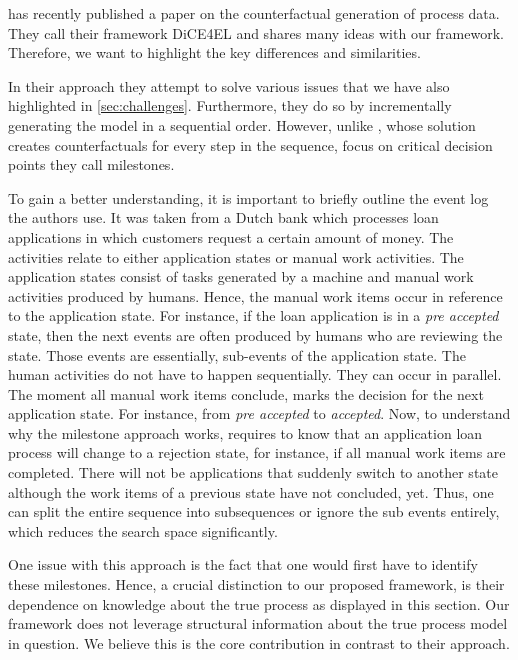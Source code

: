 \documentclass[./../../paper.tex]{subfiles}
\begin{document}
\citeauthor{hsieh_DiCE4ELInterpretingProcess_2021} has recently published a paper on the counterfactual generation of process data. They call their framework DiCE4EL and shares many ideas with our framework. Therefore, we want to highlight the key differences and similarities. 

In their approach they attempt to solve various issues that we have also highlighted in \autoref{sec:challenges}. Furthermore, they do so by incrementally generating the model in a sequential order. However, unlike \citeauthor{oberst_CounterfactualOffPolicyEvaluation_2019}, whose solution creates counterfactuals for every step in the sequence, \citeauthor{hsieh_DiCE4ELInterpretingProcess_2021} focus on critical decision points they call milestones. 

To gain a better understanding, it is important to briefly outline the event log the authors use. It was taken from a Dutch bank which processes loan applications in which customers request a certain amount of money. The activities relate to either application states or manual work activities. The application states consist of tasks generated by a machine and manual work activities produced by humans. Hence, the manual work items occur in reference to the application state. For instance, if the loan application is in a \emph{pre accepted} state, then the next events are often produced by humans who are reviewing the state. Those events are essentially, sub-events of the application state. The human activities do not have to happen sequentially. They can occur in parallel. The moment all manual work items conclude, marks the decision for the next application state. For instance, from \emph{pre accepted} to \emph{accepted}. Now, to understand why the milestone approach works, requires to know that an application loan process will change to a rejection state, for instance, if all manual work items are completed. There will not be applications that suddenly switch to another state although the work items of a previous state have not concluded, yet. Thus, one can split the entire sequence into subsequences or ignore the sub events entirely, which reduces the search space significantly. 

One issue with this approach is the fact that one would first have to identify these milestones. Hence, a crucial distinction to our proposed framework, is their dependence on knowledge about the true process as displayed in this section. Our framework does not leverage structural information about the true process model in question. We believe this is the core contribution in contrast to their approach.
\end{document}
